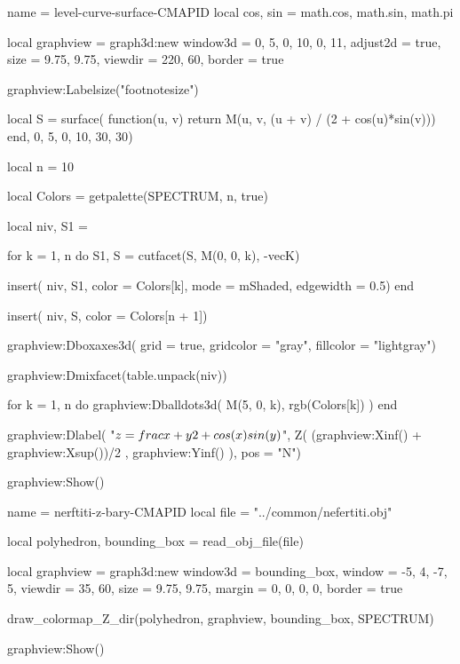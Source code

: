 \documentclass{article}
\begin{document}
\bigskip
\medskip

\begin{multicols}{2}

\begin{luadraw}{name = level-curve-surface-CMAPID}
local cos, sin = math.cos, math.sin, math.pi

local graphview = graph3d:new{
  window3d = {0, 5, 0, 10, 0, 11},
  adjust2d = true,
  size     = {9.75, 9.75},
  viewdir  = {220, 60},
  border   = true
}

graphview:Labelsize("footnotesize")

local S = surface(
  function(u, v) return M(u, v, (u + v) / (2 + cos(u)*sin(v))) end,
  0, 5, 0, 10,
  {30, 30})

local n = 10

local Colors = getpalette(SPECTRUM, n, true)

local niv, S1 = {}

for k = 1, n do
  S1, S = cutfacet(S, {M(0, 0, k), -vecK})

  insert(
    niv,
    {
      S1,
      {
        color     = Colors[k],
        mode      = mShaded,
        edgewidth = 0.5}})
end

insert(
  niv,
  {
    S,
    {color = Colors[n + 1]}})

graphview:Dboxaxes3d({
  grid      = true,
  gridcolor = "gray",
  fillcolor = "lightgray"})

graphview:Dmixfacet(table.unpack(niv))

for k = 1, n do
  graphview:Dballdots3d(
    M(5, 0, k),
    rgb(Colors[k])
  )
end

graphview:Dlabel(
  "$z = \\frac{x + y}{2 + \\cos(x) \\sin(y)}$",
  Z( (graphview:Xinf() + graphview:Xsup())/2 , graphview:Yinf() ),
  {pos = "N"})

graphview:Show()
\end{luadraw}


\begin{luadraw}{name = nerftiti-z-bary-CMAPID}
local file = "../common/nefertiti.obj"

local polyhedron, bounding_box = read_obj_file(file)

local graphview = graph3d:new{
  window3d = bounding_box,
  window   = {-5, 4, -7, 5},
  viewdir  = {35, 60},
  size     = {9.75, 9.75},
  margin   = {0, 0, 0, 0},
  border   = true
}

draw_colormap_Z_dir(polyhedron, graphview, bounding_box, SPECTRUM)

graphview:Show()
\end{luadraw}

\end{multicols}
\end{document}
